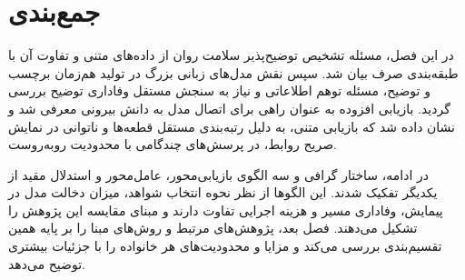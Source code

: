 \section{جمع‌بندی}

در این فصل، مسئله تشخیص توضیح‌پذیر سلامت روان از داده‌های متنی و تفاوت آن با طبقه‌بندی صرف بیان شد. سپس نقش مدل‌های زبانی بزرگ در تولید هم‌زمان برچسب و توضیح، مسئله توهم اطلاعاتی و نیاز به سنجش مستقل وفاداری توضیح بررسی گردید. بازیابی افزوده به عنوان راهی برای اتصال مدل به دانش بیرونی معرفی شد و نشان داده شد که بازیابی متنی، به دلیل رتبه‌بندی مستقل قطعه‌ها و ناتوانی در نمایش صریح روابط، در پرسش‌های چندگامی با محدودیت روبه‌روست.

در ادامه، ساختار گرافی و سه الگوی بازیابی‌محور، عامل‌محور و استدلال مقید از یکدیگر تفکیک شدند. این الگوها از نظر نحوه انتخاب شواهد، میزان دخالت مدل در پیمایش، وفاداری مسیر و هزینه اجرایی تفاوت دارند و مبنای مقایسه این پژوهش را تشکیل می‌دهند. فصل بعد، پژوهش‌های مرتبط و روش‌های مبنا را بر پایه همین تقسیم‌بندی بررسی می‌کند و مزایا و محدودیت‌های هر خانواده را با جزئیات بیشتری توضیح می‌دهد.
